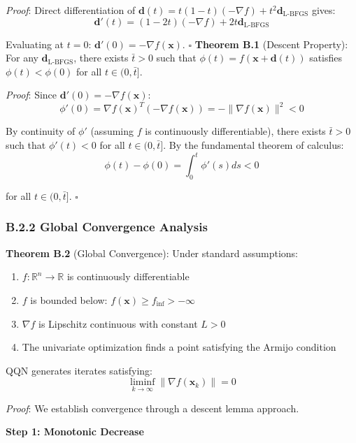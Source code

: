 \emph{Proof}: Direct differentiation of \(\mathbf{d}(t) = t(1-t)(-\nabla f) + t^2 \mathbf{d}_{\text{L-BFGS}}\) gives:
\[\mathbf{d}'(t) = (1-2t)(-\nabla f) + 2t\mathbf{d}_{\text{L-BFGS}}\]

Evaluating at \(t=0\): \(\mathbf{d}'(0) = -\nabla f(\mathbf{x})\). \(\square\)
\textbf{Theorem B.1} (Descent Property): For any \(\mathbf{d}_{\text{L-BFGS}}\), there exists \(\bar{t} > 0\) such that \(\phi(t) = f(\mathbf{x} + \mathbf{d}(t))\) satisfies \(\phi(t) < \phi(0)\) for all \(t \in (0, \bar{t}]\).

\emph{Proof}: Since \(\mathbf{d}'(0) = -\nabla f(\mathbf{x})\):
\[\phi'(0) = \nabla f(\mathbf{x})^T(-\nabla f(\mathbf{x})) = -\|\nabla f(\mathbf{x})\|^2 < 0\]

By continuity of \(\phi'\) (assuming \(f\) is continuously differentiable), there exists \(\bar{t} > 0\) such that \(\phi'(t) < 0\) for all \(t \in (0, \bar{t}]\). By the fundamental theorem of calculus:
\[\phi(t) - \phi(0) = \int_0^t \phi'(s) ds < 0\]

for all \(t \in (0, \bar{t}]\). \(\square\)

\hypertarget{b.2.2-global-convergence-analysis}{%
\subsubsection{B.2.2 Global Convergence Analysis}\label{b.2.2-global-convergence-analysis}}

\textbf{Theorem B.2} (Global Convergence): Under standard assumptions:

\begin{enumerate}
\def\labelenumi{\arabic{enumi}.}
\tightlist
\item
  \(f: \mathbb{R}^n \rightarrow \mathbb{R}\) is continuously differentiable
\item
  \(f\) is bounded below: \(f(\mathbf{x}) \geq f_{\text{inf}} > -\infty\)
\item
  \(\nabla f\) is Lipschitz continuous with constant \(L > 0\)
\item
  The univariate optimization finds a point satisfying the Armijo condition
\end{enumerate}

QQN generates iterates satisfying:
\[\liminf_{k \to \infty} \|\nabla f(\mathbf{x}_k)\| = 0\]

\emph{Proof}: We establish convergence through a descent lemma approach.

\textbf{Step 1: Monotonic Decrease}

